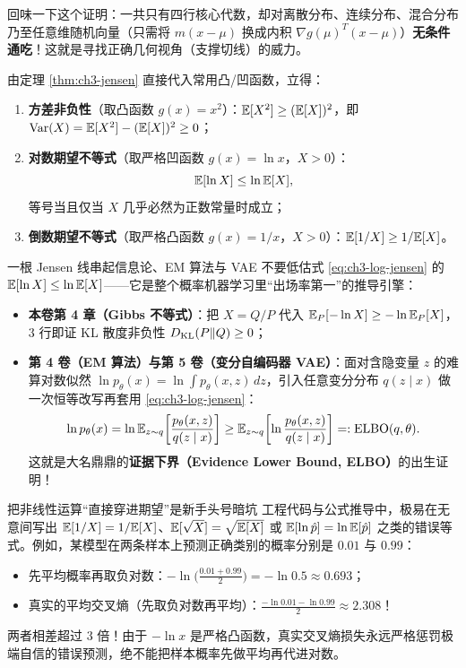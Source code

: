 回味一下这个证明：一共只有四行核心代数，却对离散分布、连续分布、混合分布乃至任意维随机向量（只需将 $m(x-\mu)$ 换成内积 $\nabla g(\mu)^T(x-\mu)$）\textbf{无条件通吃}！这就是寻找正确几何视角（支撑切线）的威力。

\begin{corollary}
\label{cor:ch3-jensen-cor}
由定理 \ref{thm:ch3-jensen} 直接代入常用凸/凹函数，立得：
\begin{enumerate}
  \item \textbf{方差非负性}（取凸函数 $g(x)=x^2$）：$\mathbb{E}[X^2] \ge (\mathbb{E}[X])^2$，即 $\operatorname{Var}(X) = \mathbb{E}[X^2] - (\mathbb{E}[X])^2 \ge 0$；
  \item \textbf{对数期望不等式}（取严格凹函数 $g(x)=\ln x$，$X > 0$）：
  \begin{equation}
    \mathbb{E}[\ln X] \le \ln \mathbb{E}[X], \label{eq:ch3-log-jensen}
  \end{equation}
  等号当且仅当 $X$ 几乎必然为正数常量时成立；
  \item \textbf{倒数期望不等式}（取严格凸函数 $g(x)=1/x$，$X > 0$）：$\mathbb{E}[1/X] \ge 1/\mathbb{E}[X]$。
\end{enumerate}
\end{corollary}

\begin{insightBox}{一根 Jensen 线串起信息论、EM 算法与 VAE}
不要低估式 \eqref{eq:ch3-log-jensen} 的 $\mathbb{E}[\ln X] \le \ln \mathbb{E}[X]$——它是整个概率机器学习里“出场率第一”的推导引擎：
\begin{itemize}
  \item \textbf{本卷第 4 章（Gibbs 不等式）}：把 $X = Q/P$ 代入 $\mathbb{E}_P[-\ln X] \ge -\ln \mathbb{E}_P[X]$，3 行即证 KL 散度非负性 $D_{\mathrm{KL}}(P\|Q) \ge 0$；
  \item \textbf{第 4 卷（EM 算法）与第 5 卷（变分自编码器 VAE）}：面对含隐变量 $z$ 的难算对数似然 $\ln p_\theta(x) = \ln \int p_\theta(x,z)\,dz$，引入任意变分分布 $q(z\mid x)$ 做一次恒等改写再套用 \eqref{eq:ch3-log-jensen}：
  \[
    \ln p_\theta(x)
    = \ln \mathbb{E}_{z\sim q}\!\left[\frac{p_\theta(x,z)}{q(z\mid x)}\right]
    \ge \mathbb{E}_{z\sim q}\!\left[\ln \frac{p_\theta(x,z)}{q(z\mid x)}\right]
    =: \mathrm{ELBO}(q, \theta).
  \]
  这就是大名鼎鼎的\textbf{证据下界（Evidence Lower Bound, ELBO）}的出生证明！
\end{itemize}
\end{insightBox}

\begin{failBox}{把非线性运算“直接穿进期望”是新手头号暗坑}
工程代码与公式推导中，极易在无意间写出 $\mathbb{E}[1/X] = 1/\mathbb{E}[X]$、$\mathbb{E}[\sqrt{X}] = \sqrt{\mathbb{E}[X]}$ 或 $\mathbb{E}[\ln \hat{p}] = \ln \mathbb{E}[\hat{p}]$ 之类的错误等式。例如，某模型在两条样本上预测正确类别的概率分别是 $0.01$ 与 $0.99$：
\begin{itemize}
  \item 先平均概率再取负对数：$-\ln\bigl(\tfrac{0.01+0.99}{2}\bigr) = -\ln 0.5 \approx 0.693$；
  \item 真实的平均交叉熵（先取负对数再平均）：$\tfrac{-\ln 0.01 - \ln 0.99}{2} \approx 2.308$！
\end{itemize}
两者相差超过 $3$ 倍！由于 $-\ln x$ 是严格凸函数，真实交叉熵损失永远严格惩罚极端自信的错误预测，绝不能把样本概率先做平均再代进对数。
\end{failBox}

